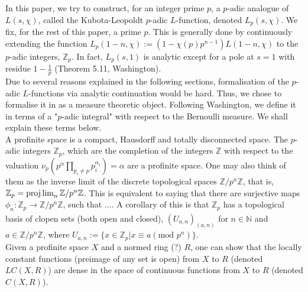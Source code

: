 \documentclass[a4paper,UKenglish,cleveref, autoref, thm-restate]{lipics-v2021}
\begin{document}
In this paper, we try to construct, for an integer prime $p$, a $p$-adic analogue of $L(s, \chi)$, 
called the Kubota-Leopoldt $p$-adic $L$-function, denoted $L_p(s, \chi)$. We fix, for the rest 
of this paper, a prime $p$. This is generally done by continuously extending the function 
$L_p(1 - n, \chi) := (1 - \chi (p) p^{n - 1}) L(1 - n, \chi)$ to the $p$-adic integers, 
$\mathbb{Z}_p$. In fact, $L_p(s, 1)$ is analytic except for a pole at $s = 1$ with residue 
$1 - \frac{1}{p}$ (Theorem 5.11, Washington). \\

Due to several reasons explained in the following sections, formalisation of the $p$-adic 
$L$-functions via analytic continuation would be hard. Thus, we chose to formalise it in 
as a measure theoretic object. Following Washington, we define it in terms of a 
"$p$-adic integral" with respect to the Bernoulli measure. We shall explain these terms below. \\

A profinite space is a compact, Hausdorff and totally disconnected space. The $p$-adic integers 
$\mathbb{Z}_p$, which are the completion of the integers $\mathbb{Z}$ with respect to the 
valuation $\nu_p(p^{\alpha} \prod_{p_i \ne p} p_i^{\alpha_i}) = \alpha$ are a profinite space. 
One may also think of them as the inverse limit of the discrete topological spaces 
$\mathbb{Z} / p^{n} \mathbb{Z}$, that is, $\mathbb{Z}_p = \projlim_{n} \mathbb{Z} / p^{n} \mathbb{Z}$. 
This is equivalent to saying that there are surjective maps $\phi_n : \mathbb{Z}_p \xrightarrow[]{} \mathbb{Z} / p^{n} \mathbb{Z}$, 
such that .... 
A corollary of this is that $\mathbb{Z}_p$ has a topological basis of clopen sets (both open and closed), 
$(U_{a, n})_{(a, n)}$ for $n \in \mathbb{N}$ and $a \in \mathbb{Z} / p^{n} \mathbb{Z}$, 
where $U_{a, n} := \{ x \in \mathbb{Z}_p | x \equiv a (\text{mod } p^n) \}$. \\

Given a profinite space $X$ and a normed ring (?) $R$, one can show that the locally constant 
functions (preimage of any set is open) from $X$ to $R$ (denoted $LC(X, R)$) are dense in the space of continuous 
functions from $X$ to $R$ (denoted $C(X, R)$). \\
\end{document}
